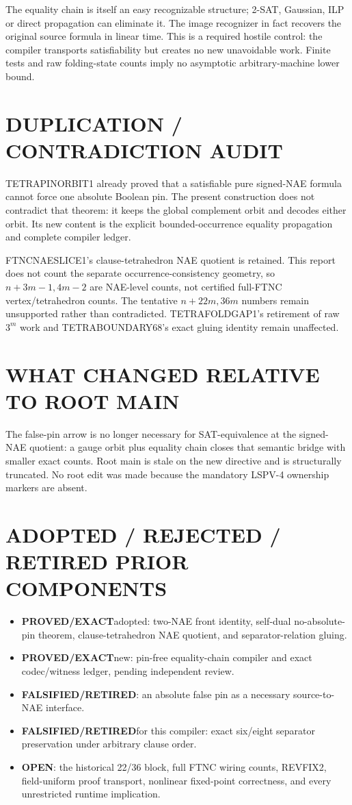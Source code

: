 \documentclass[11pt]{article}
\newcommand{\EXACT}{\textbf{PROVED/EXACT}}
\newcommand{\OPEN}{\textbf{OPEN}}
\newcommand{\RET}{\textbf{FALSIFIED/RETIRED}}
\begin{document}
The equality chain is itself an easy recognizable structure; 2-SAT, Gaussian,
ILP or direct propagation can eliminate it.  The image recognizer in fact
recovers the original source formula in linear time.  This is a required
hostile control: the compiler transports satisfiability but creates no new
unavoidable work.  Finite tests and raw folding-state counts imply no
asymptotic arbitrary-machine lower bound.

\section{DUPLICATION / CONTRADICTION AUDIT}
TETRAPINORBIT1 already proved that a satisfiable pure signed-NAE formula cannot
force one absolute Boolean pin.  The present construction does not contradict
that theorem: it keeps the global complement orbit and decodes either orbit.
Its new content is the explicit bounded-occurrence equality propagation and
complete compiler ledger.

FTNCNAESLICE1's clause-tetrahedron NAE quotient is retained.  This report does
not count the separate occurrence-consistency geometry, so $n+3m-1,4m-2$ are
NAE-level counts, not certified full-FTNC vertex/tetrahedron counts.  The
tentative $n+22m,36m$ numbers remain unsupported rather than contradicted.
TETRAFOLDGAP1's retirement of raw $3^m$ work and TETRABOUNDARY68's exact gluing
identity remain unaffected.

\section{WHAT CHANGED RELATIVE TO ROOT MAIN}
The false-pin arrow is no longer necessary for SAT-equivalence at the signed-
NAE quotient: a gauge orbit plus equality chain closes that semantic bridge
with smaller exact counts.  Root main is stale on the new directive and is
structurally truncated.  No root edit was made because the mandatory LSPV-4
ownership markers are absent.

\section{ADOPTED / REJECTED / RETIRED PRIOR COMPONENTS}
\begin{itemize}
\item \EXACT adopted: two-NAE front identity, self-dual no-absolute-pin theorem,
clause-tetrahedron NAE quotient, and separator-relation gluing.
\item \EXACT new: pin-free equality-chain compiler and exact codec/witness
ledger, pending independent review.
\item \RET: an absolute false pin as a necessary source-to-NAE interface.
\item \RET for this compiler: exact six/eight separator preservation under
arbitrary clause order.
\item \OPEN: the historical 22/36 block, full FTNC wiring counts, REVFIX2,
field-uniform proof transport, nonlinear fixed-point correctness, and every
unrestricted runtime implication.
\end{itemize}
\end{document}
